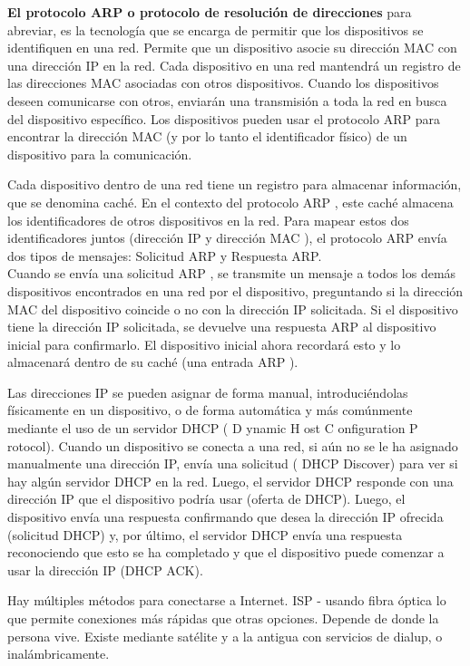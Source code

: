 \textbf{El protocolo ARP o protocolo de resolución de direcciones} para abreviar, es la tecnología que se encarga de permitir que los dispositivos se identifiquen en una red. Permite que un dispositivo asocie su dirección MAC con una dirección IP en la red. Cada dispositivo en una red mantendrá un registro de las direcciones MAC asociadas con otros dispositivos.
Cuando los dispositivos deseen comunicarse con otros, enviarán una transmisión a toda la red en busca del dispositivo específico. Los dispositivos pueden usar el protocolo ARP para encontrar la dirección MAC (y por lo tanto el identificador físico) de un dispositivo para la comunicación.

Cada dispositivo dentro de una red tiene un registro para almacenar información, que se denomina caché. En el contexto del  protocolo ARP  , este caché almacena los identificadores de otros dispositivos en la red.
%
Para mapear estos dos identificadores juntos (dirección IP y dirección MAC ), el protocolo ARP envía dos tipos de mensajes:
Solicitud ARP y 
Respuesta ARP. \\
Cuando se envía una solicitud ARP , se transmite un mensaje a todos los demás dispositivos encontrados en una red por el dispositivo, preguntando si la dirección MAC del dispositivo coincide o no con la dirección IP solicitada. Si el dispositivo tiene la dirección IP solicitada, se devuelve una respuesta ARP al dispositivo inicial para confirmarlo. El dispositivo inicial ahora recordará esto y lo almacenará dentro de su caché (una entrada ARP ). 

Las direcciones IP se pueden asignar de forma manual, introduciéndolas físicamente en un dispositivo, o de forma automática y más comúnmente mediante el uso de un servidor DHCP ( D ynamic H ost C onfiguration P rotocol). Cuando un dispositivo se conecta a una red, si aún no se le ha asignado manualmente una dirección IP, envía una solicitud ( DHCP Discover) para ver si hay algún servidor DHCP en la red. Luego, el servidor DHCP responde con una dirección IP que el dispositivo podría usar (oferta de DHCP). Luego, el dispositivo envía una respuesta confirmando que desea la dirección IP ofrecida (solicitud DHCP) y, por último, el servidor DHCP envía una respuesta reconociendo que esto se ha completado y que el dispositivo puede comenzar a usar la dirección IP (DHCP ACK).




Hay múltiples métodos para conectarse a Internet. ISP  - usando fibra óptica lo que permite conexiones más rápidas que otras opciones. Depende de donde la persona vive. Existe mediante satélite y a la antigua con servicios de dialup, o inalámbricamente. 

